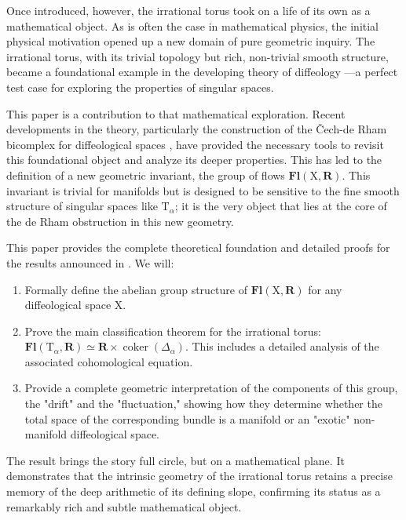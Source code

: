 \documentclass[10pt,letterpaper,reqno]{amsart}
\theoremstyle{article}
\newcommand{\1}{{\hat 1}}
\newcommand{\0}{{\hat 0}}
\newcommand{\RR}{\mathbf R}
\def \T{\mathrm T}
\def \X{\mathrm X}
\newcommand{\coker}{\operatorname{coker}}
\DeclareMathOperator{\Fb}{\boldsymbol{\mathsf{Fl}}}
\renewcommand{\Fb}{\mathbf{Fl}}
\begin{document}
  Once introduced,
  however,
  the irrational torus took on a life of its own as a mathematical object.
  As is often the case in mathematical physics,
  the initial physical motivation opened up a new domain of pure geometric inquiry.
  The irrational torus,
  with its trivial topology but rich,
  non-trivial smooth structure,
  became a foundational example in the developing theory of diffeology
  ---a perfect test case for exploring the properties of singular spaces.
  
  This paper is a contribution to that mathematical exploration.
  Recent developments in the theory,
  particularly the construction of the Čech-de Rham bicomplex for diffeological spaces \cite{PIZ24},
  have provided the necessary tools to revisit this foundational object and analyze its deeper properties.
  This has led to the definition of a new geometric invariant,
  the group of flows $\Fb(\X, \RR)$.
  This invariant is trivial for manifolds but is designed to be sensitive to the fine smooth structure of singular spaces like $\T_\alpha$;
  it is the very object that lies at the core of the de Rham obstruction in this new geometry.
  
  This paper provides the complete theoretical foundation and detailed proofs for the results announced in \cite{PIZ25a}.
  We will:
  \begin{enumerate}
    \item Formally define the abelian group structure of $\Fb(\X, \RR)$ for any diffeological space $\X$.
    \item Prove the main classification theorem for the irrational torus: $\Fb(\T_\alpha, \RR) \simeq \RR \times \coker(\Delta_\alpha)$.
    This includes a detailed analysis of the associated cohomological equation.
    \item Provide a complete geometric interpretation of the components of this group,
    the "drift" and the "fluctuation,"
    showing how they determine whether the total space of the corresponding bundle is a manifold or an "exotic" non-manifold diffeological space.
  \end{enumerate}
  
  The result brings the story full circle,
  but on a mathematical plane.
  It demonstrates that the intrinsic geometry of the irrational torus retains a precise memory of the deep arithmetic of its defining slope,
  confirming its status as a remarkably rich and subtle mathematical object.

      
\end{document}
